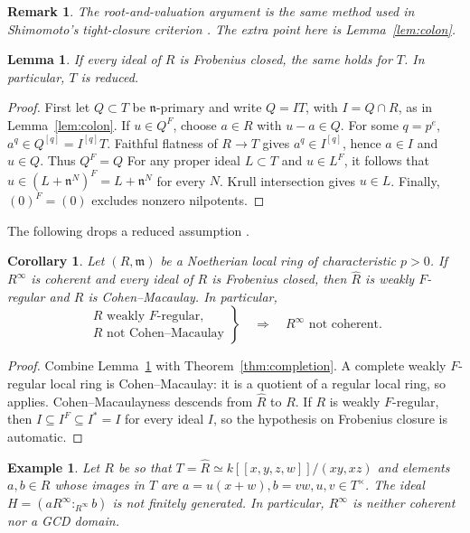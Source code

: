 \documentclass[11pt,a4paper]{amsart}
\numberwithin{equation}{section}
\newtheorem{corollary}[theorem]{Corollary}
\newtheorem{lemma}[theorem]{Lemma}
\newtheorem{example}[theorem]{Example}\newtheorem{notation}[theorem]{Notation}
\newtheorem{remark}[theorem]{Remark}
\newcommand{\fm}{\mathfrak m}
\newcommand{\fn}{\mathfrak n}
\begin{document}
 \begin{remark}	The root-and-valuation argument is the same method used in	Shimomoto's tight-closure criterion	\cite[Proposition 3.12; Proposition 3.11]{Shim}.	The extra point here is Lemma~\ref{lem:colon}. 
 \end{remark}
 
 \begin{lemma}\label{lem:fclosed}	If every ideal of $R$ is Frobenius closed, the same holds for $T$. 	In particular, $T$ is reduced.
 \end{lemma}
 
 \begin{proof} 	First let $Q\subset T$ be $\fn$-primary and write $Q=IT$, with 	$I=Q\cap R$, as in Lemma~\ref{lem:colon}. If $u\in Q^F$, choose 	$a\in R$ with $u-a\in Q$. For some $q=p^e$,
$a^q\in Q^{[q]}=I^{[q]}T.$	Faithful flatness of $R\to T$ gives $a^q\in I^{[q]}$, hence	$a\in I$ and $u\in Q$. Thus $Q^F=Q$ 	For any proper ideal $L\subset T$ and $u\in L^F$, it follows that	$u\in (L+\fn^N)^F=L+\fn^N$ for every $N$. Krull intersection	gives $u\in L$. Finally, $(0)^F=(0)$ excludes nonzero nilpotents.
 \end{proof}
 The following drops  a reduced assumption \cite{Shim}.
 \begin{corollary}\label{cor:CM} 
 	Let $(R,\fm)$ be a Noetherian local ring of characteristic $p>0$. 	If $R^\infty$ is coherent and every ideal of $R$ is Frobenius
 	closed, then $\widehat R$ is weakly $F$-regular and $R$ is
 	Cohen--Macaulay. In particular,
 	$$	\left.
 	\begin{array}{l}
 		R\text{ weakly $F$-regular},\\
 		R\text{ not Cohen--Macaulay}
 	\end{array}\right\}
 	\quad\Longrightarrow\quad R^\infty\text{ not coherent}.$$
 \end{corollary}
 
 \begin{proof}	Combine Lemma~\ref{lem:fclosed} with	Theorem~\ref{thm:completion}. A complete weakly $F$-regular local	ring is Cohen--Macaulay: it is a quotient of a regular local ring,	so \cite[Proposition 4.2(c)]{HH} applies.	Cohen--Macaulayness descends from $\widehat R$	to $R$. If $R$ is weakly $F$-regular, then	$I\subseteq I^F\subseteq I^*=I$ for every ideal $I$, so the	hypothesis on Frobenius closure is automatic.
 \end{proof}



 
 \begin{example}\label{thm:explicit}
Let $R$ be so that $ T=\widehat R\simeq k[[x,y,z,w]]/(xy,xz)
$ and elements $a,b\in R$ whose images in $T$ are
$a=u(x+w), b=vw,
  u,v\in T^\times.$
The ideal
 $	H=(aR^\infty:_{R^\infty}b)$	is not finitely generated. In particular, $R^\infty$ is neither	coherent nor a GCD domain.
 \end{example}
 
\end{document}
